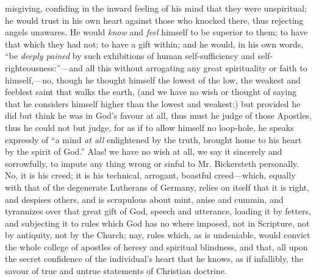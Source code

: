 misgiving, confiding in the inward feeling of his mind that they were
unspiritual; he would trust in his own heart against those who knocked
there, thus rejecting angels unawares. He would \emph{know} and \emph{feel}
himself to be superior to them; to have that which they had not;
to have a gift within; and he would, in his own words, ``be \emph{deeply
pained} by such exhibitions of human self-sufficiency and
self-righteousness:''—and all this without arrogating any great
spirituality or faith to himself,—no, though he thought himself the
lowest of the low, the weakest and feeblest saint that walks the earth,
(and we have no wish or thought of saying that he considers himself
higher than the lowest and weakest;) but provided he did but think he
was in God's favour at all, thus must he judge of those Apostles, thus
he could not but judge, for as if to allow himself no loop-hole, he
speaks expressly of ``a mind \emph{at all} enlightened by the truth,
brought home to his heart by the spirit of God.'' Alas! we have no wish
at all, we say it sincerely and sorrowfully, to impute any thing wrong
or sinful to Mr. Bickersteth personally. No, it is his creed; it is his
technical, arrogant, boastful creed—which, equally with that of the
degenerate Lutherans of Germany, relies on itself that it is right, and
despises others, and is scrupulous about mint, anise and cummin, and
tyrannizes over that great gift of God, speech and utterance, loading it
by fetters, and subjecting it to rules which God has no where imposed,
not in Scripture, not by antiquity, not by the Church; nay, rules which,
as is undeniable, would convict the whole college of apostles of heresy
and spiritual blindness, and that, all upon the secret confidence of the
individual's heart that he knows, as if infallibly, the savour of true
and untrue statements of Christian doctrine.

